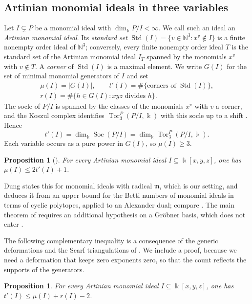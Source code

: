 \documentclass{amsart}
\newtheorem{proposition}[theorem]{Proposition}
\theoremstyle{definition}
\theoremstyle{remark}
\numberwithin{equation}{section}
\newcommand{\N}{\mathbb{N}}
\newcommand{\kk}{\Bbbk}
\newcommand{\fm}{\mathfrak{m}}
\DeclareMathOperator{\Soc}{Soc}
\DeclareMathOperator{\Std}{Std}
\DeclareMathOperator{\Tor}{Tor}
\begin{document}
\subsection{Artinian monomial ideals in three variables}

Let $I\subsetneq P$ be a monomial ideal with $\dim_\kk P/I<\infty$. We call such an ideal an \emph{Artinian monomial ideal}. Its \emph{standard set} $\Std(I)=\{v\in\N^3 : x^v\notin I\}$ is a finite nonempty order ideal of $\N^3$; conversely, every finite nonempty order ideal $T$ is the standard set of the Artinian monomial ideal $I_T$ spanned by the monomials $x^v$ with $v\notin T$. A \emph{corner} of $\Std(I)$ is a maximal element. We write $G(I)$ for the set of minimal monomial generators of $I$ and set
\begin{gather*}
\mu(I)=|G(I)|,\qquad t'(I)=\#\{\text{corners of }\Std(I)\},\\
r(I)=\#\{h\in G(I) : xyz \text{ divides } h\}.
\end{gather*}
The socle of $P/I$ is spanned by the classes of the monomials $x^v$ with $v$ a corner, and the Koszul complex identifies $\Tor_3^P(P/I,\kk)$ with this socle up to a shift \cite{BH93}. Hence
\begin{equation}\label{eq:beta3}
t'(I)=\dim_\kk\Soc(P/I)=\dim_\kk\Tor_3^P(P/I,\kk).
\end{equation}
Each variable occurs as a pure power in $G(I)$, so $\mu(I)\ge3$.

\begin{proposition}[{\cite[Theorem~3.2]{Dun18}}]\label{prop:dung}
For every Artinian monomial ideal $I\subseteq\kk[x,y,z]$, one has $\mu(I)\le 2t'(I)+1$.
\end{proposition}

Dung states this for monomial ideals with radical $\fm$, which is our setting, and deduces it from an upper bound for the Betti numbers of monomial ideals in terms of cyclic polytopes, applied to an Alexander dual; compare \cite[Theorem~6.3]{BPS98}. The main theorem of \cite{Dun18} requires an additional hypothesis on a Gr\"obner basis, which does not enter \cite[Theorem~3.2]{Dun18}.

The following complementary inequality is a consequence of the generic deformations and the Scarf triangulations of \cite{BPS98}. We include a proof, because we need a deformation that keeps zero exponents zero, so that the count reflects the supports of the generators.

\begin{proposition}\label{prop:scarf}
For every Artinian monomial ideal $I\subseteq\kk[x,y,z]$, one has $t'(I)\le\mu(I)+r(I)-2$.
\end{proposition}
\end{document}
